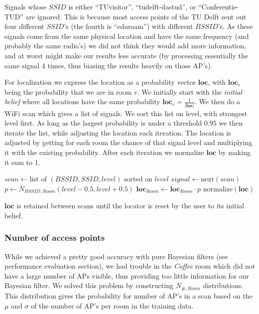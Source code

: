 \documentclass[a4paper,10pt,twoside]{IEEEtran}
\begin{document}
Signals whose $SSID$ is either ``TUvisitor'', ``tudelft-dastud'',
or ``Conferentie-TUD'' are ignored.
This is because most access points of the TU Delft sent out four different $SSID$'s (the fourth is ``eduroam'') with different $BSSID$'s.
As these signals come from the same physical location and have the same
frequency (and probably the same radio's) we did not think they would add more
information, and at worst might make our results less accurate (by processing
essentially the same signal 4 times, thus biasing the results heavily on those AP's).

For localization we express the location as a probability vector $\mathbf{loc}$, with $\mathbf{loc}_{r}$ being the probability that we are in room $r$. 
We initially start with the \emph{initial belief} where all locations have the same probability $\mathbf{loc}_r = \frac{1}{|\mathbf{loc}|}$.
We then do a WiFi scan which gives a list of signals.
We sort this list on level, with strongest level first.
As long as the largest probability is under a threshold $0.95$ we then iterate the list, while adjusting the location each iteration.
The location is adjusted by getting for each room the chance of that signal level and multiplying it with the existing probability. After each iteration we normalize $\mathbf{loc}$ by making it sum to 1.
\\
\begin{algorithmic}
	\State $scan \gets \text{list of } (BSSID, SSID, level) \text{ sorted on }level$
		\State $signal \gets \text{next}\left(scan\right)$
			\State $p \gets N_{BSSID,Room}(level-0.5,level+0.5)$
			\State $\mathbf{loc}_{Room} \gets \mathbf{loc}_{Room} \cdot p $
		\EndFor
		\State $\text{normalize}\left(\mathbf{loc}\right)$
	\EndWhile
\end{algorithmic}

$\mathbf{loc}$ is retained between scans until the locator is reset by the user to its initial belief.

\subsubsection{Number of access points}
\label{subsec:loc-numap}

While we achieved a pretty good accuracy with pure Bayesian filters (see performance evaluation section), we had trouble in the \emph{Coffee} room which did not have a large number of APs visible, thus providing too little information for our Bayesian filter.
We solved this problem by constructing $N_{\#,Room}$ distributions.
This distribution gives the probability for number of AP's in a scan based on the $\mu$ and $\sigma$ of the number of AP's per room in the training data.
\end{document}
